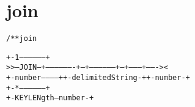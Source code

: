 \section{join}
\begin{shaded}
\begin{alltt}
/** join


             +-1-----------------+
   >>--JOIN--+-------------------+--+-----------------+--+--------+-------><
             +-number------------+  +-delimitedString-+  +-number-+
             +-*-----------------+
             +-KEYLENgth--number-+

\end{alltt}
\end{shaded}
